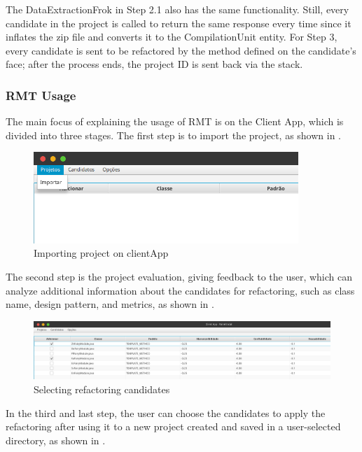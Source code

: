 The DataExtractionFrok in Step 2.1 also has the same functionality. Still, every candidate in the project is called to return the same response every time since it inflates the zip file and converts it to the CompilationUnit entity. For Step 3, every candidate is sent to be refactored by the method defined on the candidate's face; after the process ends, the project ID is sent back via the stack.

\subsubsection{RMT Usage}
\label{sub-usage}

The main focus of explaining the usage of RMT is on the Client App, which is divided into three stages. The first step is to import the project, as shown in .

\begin{figure}[ht!]
\SetCaptionWidth{\textwidth}
\caption{Importing project on clientApp}
\label{fig-import}
\includegraphics[width =100mm]{Chapter-2/Figures/import.png}
\end{figure}
\FloatBarrier


The second step is the project evaluation, giving feedback to the user, which can analyze additional information about the candidates for refactoring, such as class name, design pattern, and metrics, as shown in .

\begin{figure}[ht!]
\SetCaptionWidth{\textwidth}
\caption{Selecting refactoring candidates}
\label{fig-choose}
\includegraphics[width =\textwidth]{Chapter-2/Figures/choose.png}
\end{figure}
\FloatBarrier

In the third and last step, the user can choose the candidates to apply the refactoring after using it to a new project created and saved in a user-selected directory, as shown in .

